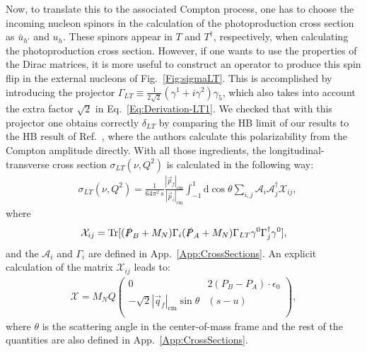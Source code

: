 \documentclass[twocolumn,prc,showpacs,nofootinbib,preprintnumbers,amsmath,amssymb,superscriptaddress]{revtex4-1}
\def\dd{\mathrm{d}}
\begin{document}
Now, to translate this to the associated Compton process, one has to choose the incoming nucleon spinors in the calculation of the photoproduction cross section as $\bar{u}_{h'}$ and $u_{h}$. 
These spinors appear in $T$ and $T^\dagger$, respectively, when calculating the photoproduction cross section. However, if one wants to use the properties of the Dirac matrices, it is more useful to construct an operator to produce this spin flip in the external nucleons of Fig.~\ref{Fig:sigmaLT}. 
This is accomplished by introducing the projector $\Gamma_{LT}\equiv \frac{1}{2\sqrt{2}}(\gamma^1+ i \gamma^2)\gamma_5$, which also takes into account the extra factor $\sqrt{2}$ in Eq.~\eqref{Eq:Derivation-LT1}. 
We checked that with this projector one obtains correctly $\delta_{LT}$ by comparing the HB limit of our results to the HB result of Ref.~\cite{Kao:2002cp}, where the authors calculate this polarizability from the Compton amplitude directly.
With all those ingredients, the longitudinal-transverse cross section $\sigma_{LT}(\nu,Q^2)$ is calculated in the following way:
\begin{align}\label{Eq:Derivation-LT2}
&\sigma_{LT}(\nu,Q^2)=\frac{1}{64\pi^2\,s}\frac{|\vec{p}_f|_\mathrm{cm}}{|\vec{p}_i|_\mathrm{cm}} \int_{-1}^{1}\!\!\!\! \dd\!\cos\!\theta \sum_{i,j} \mathcal{A}_i  \mathcal{A}^\dagger_j \mathcal{X}_{ij}, 
\end{align}
where 
\begin{align}
\mathcal{X}_{ij}=\text{Tr}[(\slashed{P}_B+M_N)\Gamma_i(\slashed{P}_A+M_N)\Gamma_{LT}\gamma^0\Gamma_j^\dagger\gamma^0 ],
\end{align}
and the $\mathcal{A}_i$ and $\Gamma_i$ are defined in App.~\ref{App:CrossSections}. An explicit calculation of the matrix $\mathcal{X}_{ij}$ leads to:
\begin{align}
 \mathcal{X}=M_N Q \left(\begin{array}{cc}
  0   & 2  (P_B-P_A)\cdot \epsilon_0 \\
 -\sqrt{2} |\vec{q}_f|_\mathrm{cm} \sin\theta &  (s-u) \\
 \end{array}
 \right),
 \end{align}
where $\theta$ is the scattering angle in the center-of-mass frame and the rest of the quantities are also defined in App.~\ref{App:CrossSections}.
\end{document}
